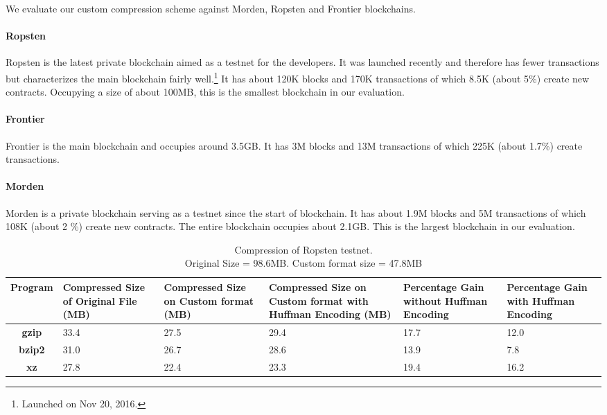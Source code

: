 

We evaluate our custom compression scheme against Morden, Ropsten and Frontier blockchains.
\paragraph{Ropsten}
Ropsten is the latest private blockchain aimed as a testnet for the \eth{} developers. It was launched recently and therefore has fewer transactions but characterizes the main blockchain fairly well.\footnote{Launched on Nov 20, 2016.}
It has about 120K blocks and 170K transactions of which 8.5K (about 5\%) create new contracts.
Occupying a size of about 100MB, this is the smallest blockchain in our evaluation. 
\paragraph{Frontier}
Frontier is the main \eth{} blockchain and occupies around 3.5GB. It has 3M blocks and 13M transactions of which 225K (about 1.7\%) create transactions. 

\paragraph{Morden}
Morden is a private blockchain serving as a testnet since the start of \eth{} blockchain. 
It has about 1.9M blocks and 5M transactions of which 108K (about 2 \%) create new contracts. The entire blockchain occupies about 2.1GB.
This is the largest blockchain in our evaluation.

\begin{table}[!b]
\centering
\captionsetup{justification=centering}
\begin{tabular}{ >{\bfseries}c| p{2cm} | p{2cm} |p{2cm} | p{1.5cm} | p{1.5cm} }
	Program & {Compressed Size of Original File (MB)} & {Compressed Size on Custom format (MB)} & {Compressed Size on Custom format with Huffman Encoding (MB)}& Percentage Gain without Huffman Encoding & Percentage Gain with Huffman Encoding\\
  \hline
  gzip  & 33.4 & 27.5 & 29.4 & 17.7 & 12.0 \\
  bzip2 & 31.0 & 26.7 & 28.6 & 13.9 & 7.8  \\
  xz   & 27.8 & 22.4 &  23.3 & 19.4 & 16.2 \\
\end{tabular}
\caption{Compression of Ropsten testnet. \\ Original Size = 98.6MB. Custom format size = 47.8MB}
\label{tab:compropsten}
\end{table}

